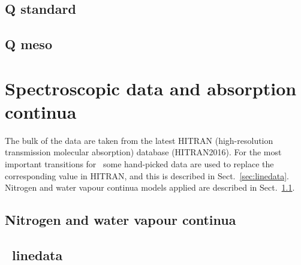 \clearpage
\newpage
\subsection{Q standard}
\label{sec:standard}
\clearpage
\newpage

\subsection{Q meso}
\label{sec:meso}

\clearpage
\newpage
\section{Spectroscopic data and absorption continua}
\label{sec:spectroscopy}

The bulk of the data are taken from the latest HITRAN 
(high-resolution transmission molecular absorption)
database (HITRAN2016).
For the most important transitions for \smr\ some hand-picked
data are used to replace the corresponding value in HITRAN,
and this is described in Sect.~\ref{sec:linedata}.
Nitrogen and water vapour continua models applied
are described in Sect.~\ref{sec:continua}.


\subsection{Nitrogen and water vapour continua}
\label{sec:continua}

\subsection{\smr\ linedata}
\label{sec:linedata}

